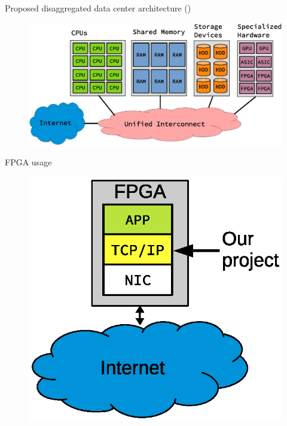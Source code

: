 \begin{frame}
	Proposed disaggregated data center architecture (\cite{7830659})
\begin{figure}
	\centering
\includegraphics[scale=0.5]{./background/dc_architectures_disaggregated.eps}
\end{figure}
\end{frame}


\begin{frame}
FPGA usage
\begin{figure}
	\centering
\includegraphics[scale=0.5]{./background/fpga_usage.eps}
\end{figure}

\end{frame}

